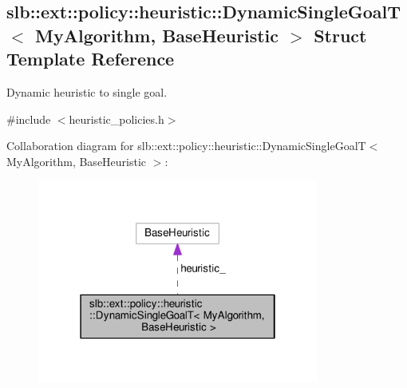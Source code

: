 \hypertarget{structslb_1_1ext_1_1policy_1_1heuristic_1_1DynamicSingleGoalT}{}\subsection{slb\+:\+:ext\+:\+:policy\+:\+:heuristic\+:\+:Dynamic\+Single\+GoalT$<$ My\+Algorithm, Base\+Heuristic $>$ Struct Template Reference}
\label{structslb_1_1ext_1_1policy_1_1heuristic_1_1DynamicSingleGoalT}


Dynamic heuristic to single goal.  




{\ttfamily \#include $<$heuristic\+\_\+policies.\+h$>$}



Collaboration diagram for slb\+:\+:ext\+:\+:policy\+:\+:heuristic\+:\+:Dynamic\+Single\+GoalT$<$ My\+Algorithm, Base\+Heuristic $>$\+:\nopagebreak
\begin{figure}[H]
\begin{center}
\leavevmode
\includegraphics[width=262pt]{structslb_1_1ext_1_1policy_1_1heuristic_1_1DynamicSingleGoalT__coll__graph}
\end{center}
\end{figure}
